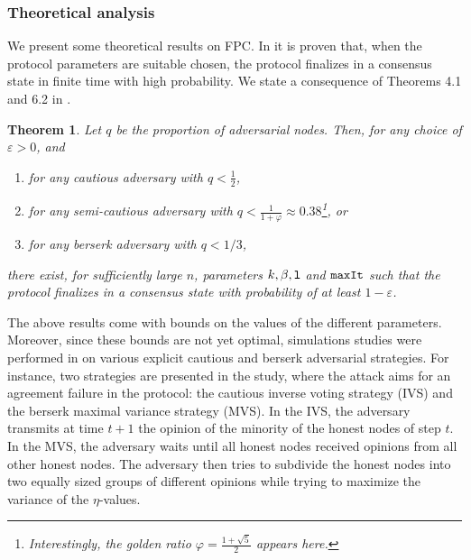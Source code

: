 \documentclass[../main.tex]{subfiles}
\begin{document}
\subsubsection{Theoretical analysis}
We present some theoretical results on FPC.  In \cite{popov2019} it is proven that, when the protocol parameters are suitable chosen, the protocol finalizes in a consensus state in finite time with high probability. We state a consequence of Theorems 4.1 and  6.2  in \cite{popov2019}.  
\newtheorem{theorem}{Theorem}
\begin{theorem}
Let $q$ be the proportion of adversarial nodes. Then, for any choice of $\varepsilon>0$, and 
\begin{enumerate}
    \item for any cautious adversary with $q<\frac12$,
    \item for any semi-cautious adversary with $q<\frac{1}{1+\varphi}\approx 0.38$\footnote{Interestingly, the golden ratio $\varphi=\frac{1+\sqrt{5}}2$ appears here.}, or
    \item for any berserk adversary with $q<1/3$,
\end{enumerate}
    there exist, for sufficiently large $n$, parameters $k, \beta, \verb?l?$ and $\verb?maxIt?$  such that the protocol finalizes in a consensus state with probability of at least $1-\varepsilon$.
\end{theorem}
The above results come with bounds on the values of the different parameters. Moreover, since these bounds are not yet optimal, simulations studies were performed in \cite{FPCsim2019} on various  explicit cautious and berserk adversarial strategies.
For instance, two strategies are presented in the study, where the attack aims for an agreement failure in the protocol: the cautious inverse voting strategy (IVS) and the berserk maximal variance strategy (MVS). In the IVS, the adversary transmits at time $t+1$ the opinion of the minority of the honest nodes of step $t$. In the MVS, the adversary waits until all honest nodes received opinions from all other honest nodes. The adversary then tries to subdivide the honest nodes into two equally sized groups of different opinions while trying to maximize the variance of the $\eta$-values. 
\end{document}
